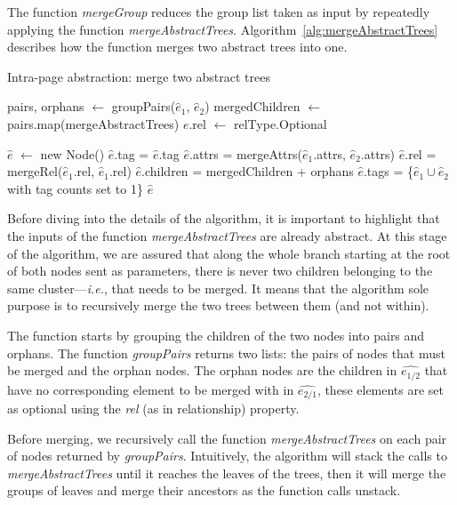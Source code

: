 \documentclass[sigconf,authordraft]{acmart}
\theoremstyle{definition}
\begin{document}
The function \emph{mergeGroup} reduces the group list taken as input by repeatedly applying the function \emph{mergeAbstractTrees}.
Algorithm~\ref{alg:mergeAbstractTrees} describes how the function merges two abstract trees into one.

\begin{algorithm}
\caption{Intra-page abstraction: merge two abstract trees}\label{alg:mergeAbstractTrees}
\begin{algorithmic}[1]
    \State {}
    \State pairs, orphans $\gets$ groupPairs($\hat{e}_1$, $\hat{e}_2$)
    \State mergedChildren $\gets$ pairs.map(mergeAbstractTrees)
        \State $e$.rel $\gets$ relType.Optional
    \EndFor
    
    \State $\hat{e}$ $\gets$ new Node()
    \State $\hat{e}$.tag = $\hat{e}$.tag
    \State $\hat{e}$.attrs = mergeAttrs($\hat{e}_1$.attrs, $\hat{e}_2$.attrs)
    \State $\hat{e}$.rel = mergeRel($\hat{e}_1$.rel, $\hat{e}_1$.rel)
    \State $\hat{e}$.children = mergedChildren + orphans
    \State $\hat{e}$.tags = \{$\hat{e}_1 \cup \hat{e}_2$ with tag counts set to 1\}
    \State \Return $\hat{e}$
  \EndFunction
\end{algorithmic}
\end{algorithm}

Before diving into the details of the algorithm, it is important to highlight that the inputs of the function \emph{mergeAbstractTrees} are already abstract.
At this stage of the algorithm, we are assured that along the whole branch starting at the root of both nodes sent as parameters, there is never two children belonging to the same cluster---\emph{i.e.}, that needs to be merged.
It means that the algorithm sole purpose is to recursively merge the two trees between them (and not within).

The function starts by grouping the children of the two nodes into pairs and orphans.
The function \emph{groupPairs} returns two lists: the pairs of nodes that must be merged and the orphan nodes. 
The orphan nodes are the children in $\hat{e_{1/2}}$ that have no corresponding element to be merged with in $\hat{e_{2/1}}$, these elements are set as optional using the \emph{rel} (as in relationship) property.

Before merging, we recursively call the function \emph{mergeAbstractTrees} on each pair of nodes returned by \emph{groupPairs}.
Intuitively, the algorithm will stack the calls to \emph{mergeAbstractTrees} until it reaches the leaves of
the trees, then it will merge the groups of leaves and merge their ancestors as the function calls unstack.
\end{document}
